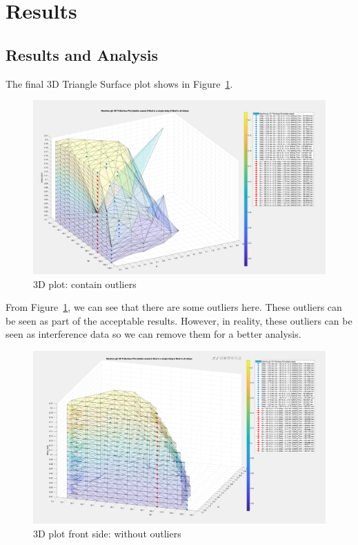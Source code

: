\section{Results} %
\subsection{Results and Analysis} %
The final 3D Triangle Surface plot shows in Figure~\ref{5_4_1_Outlier}. 

\begin{figure}[htbp]
\centering
\includegraphics[width = .819\textwidth]{figure/5_4_1_Outlier.png}
\caption{3D plot: contain outliers}
\label{5_4_1_Outlier}
\end{figure}

From Figure~\ref{5_4_1_Outlier}, we can see that there are some outliers here. These outliers can be seen as part of the acceptable results. However, in reality, these outliers can be seen as interference data so we can remove them for a better analysis. 

\begin{figure}[htbp]
\centering
\includegraphics[width = .819\textwidth]{figure/5_4_1_without_Outlier1.png}
\caption{3D plot front side: without outliers}
\label{5_4_1_without_Outlier1}
\end{figure}

